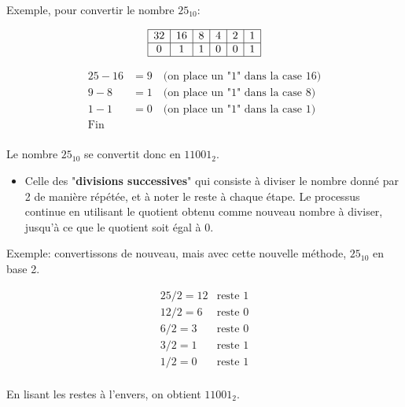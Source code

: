 \documentclass[12pt]{article}
\begin{document}
	Exemple, pour convertir le nombre $25_{10}$:
	
	\[
	\begin{array}{|c|c|c|c|c|c|c|c|}
		\hline
		32 & 16 & 8 & 4 & 2 & 1 \\
		\hline
		0 & 1 & 1 & 0 & 0 & 1 \\
		\hline
	\end{array}
	\]
	
	\[
	\begin{array}{ll}
		25 - 16 &= 9 \quad \text{(on place un "1" dans la case \(16\))} \\
		9 - 8 &= 1 \quad \text{(on place un "1" dans la case \(8\))} \\
		1 - 1 &= 0 \quad \text{(on place un "1" dans la case \(1\))} \\
		\text{Fin} & \\
	\end{array}
	\]
	
	Le nombre \(25_{10}\) se convertit donc en \(11001_{2}\).
	
		\begin{itemize}
		\item Celle des "\textbf{divisions successives}" qui consiste à diviser le nombre donné par 2 de manière répétée, et à noter le reste à chaque étape.
		Le processus continue en utilisant le quotient obtenu comme nouveau nombre à diviser, jusqu'à ce que le quotient soit égal à 0.
	\end{itemize}
	
	Exemple: convertissons de nouveau, mais avec cette nouvelle méthode, \(25_{10}\) en base 2.
	
	\[
	\begin{array}{ll}
		25 / 2 = 12 & \text{reste } 1 \\
		12 / 2 = 6 & \text{reste } 0 \\
		6 / 2 = 3 & \text{reste } 0 \\
		3 / 2 = 1 & \text{reste } 1 \\
		1 / 2 = 0 & \text{reste } 1 \\
	\end{array}
	\]
	
	En lisant les restes à l'envers, on obtient \(11001_{2}\).
	
\end{document}
